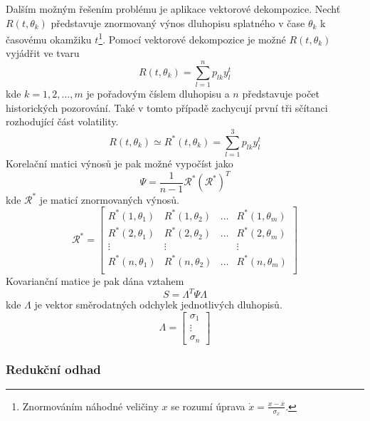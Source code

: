 \documentclass[a4paper]{book}
\begin{document}
Dalším možným řešením problému je aplikace vektorové dekompozice. Nechť $R(t, \theta_k)$ představuje znormovaný výnos dluhopisu splatného v čase $\theta_k$ k časovému okamžiku $t$\footnote{Znormováním náhodné veličiny $x$ se rozumí úprava $\dot{x} = \frac{x - \overline{x}}{\sigma_x}$.}. Pomocí vektorové dekompozice je možné $R(t, \theta_k)$ vyjádřit ve tvaru
\begin{equation*}
R(t, \theta_k) = \sum_{l=1}^n p_{lk}y_l^t
\end{equation*}
kde $k = 1, 2, \dots, m$ je pořadovým číslem dluhopisu a $n$ představuje počet historických pozorování. Také v tomto případě zachycují první tři sčítanci rozhodující část volatility.
\begin{equation*}
R(t, \theta_k) \simeq R^*(t, \theta_k) = \sum_{l=1}^3 p_{lk}y_l^t
\end{equation*}
Korelační matici výnosů je pak možné vypočíst jako
\begin{equation*}
\Psi = \frac{1}{n-1}\mathcal{R}^*(\mathcal{R}^*)^T
\end{equation*}
kde $\mathcal{R}^*$ je maticí znormovaných výnosů.
\begin{equation*}
\mathcal{R}^* =
\begin{bmatrix}
R^*(1, \theta_1) & R^*(1, \theta_2) & \dots & R^*(1, \theta_m) \\
R^*(2, \theta_1) & R^*(2, \theta_2) & \dots & R^*(2, \theta_m) \\
\vdots & \vdots & & \vdots \\
R^*(n, \theta_1) & R^*(n, \theta_2) & \dots & R^*(n, \theta_m) \\
\end{bmatrix}
\end{equation*}
Kovarianční matice je pak dána vztahem
\begin{equation*}
S = \Lambda^T \Psi \Lambda
\end{equation*}
kde $\Lambda$ je vektor směrodatných odchylek jednotlivých dluhopisů.
\begin{equation*}
\Lambda =
\begin{bmatrix}
\sigma_1 \\
\vdots \\
\sigma_n
\end{bmatrix}
\end{equation*}

\subsubsection{Redukční odhad}
\end{document}
